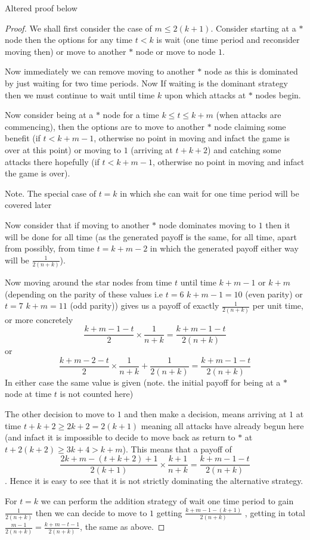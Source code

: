 \documentclass[a4paper,10pt]{article}
\theoremstyle{definition}
\theoremstyle{definition}
\theoremstyle{remark}
\theoremstyle{definition}
\begin{document}
Altered proof below
\begin{proof}
We shall first consider the case of $m \leq 2(k+1)$. Consider starting at a $*$ node then the options for any time $t<k$ is wait (one time period and reconsider moving then) or move to another $*$ node or move to node $1$.

Now immediately we can remove moving to another $*$ node as this is dominated by just waiting for two time periods. Now If waiting is the dominant strategy then we must continue to wait until time $k$ upon which attacks at $*$ nodes begin.

Now consider being at a $*$ node for a time $k \leq t \leq k+m$ (when attacks are commencing), then the options are to move to another $*$ node claiming some benefit (if $t<k+m-1$, otherwise no point in moving and infact the game is over at this point) or moving to $1$ (arriving at $t+k+2$) and catching some attacks there hopefully (if $t < k+m-1$, otherwise no point in moving and infact the game is over).

Note. The special case of $t=k$ in which she can wait for one time period will be covered later

Now consider that if moving to another $*$ node dominates moving to $1$ then it will be done for all time (as the generated payoff is the same, for all time, apart from possibly, from time $t=k+m-2$ in which the generated payoff either way will be $\frac{1}{2(n+k)}$).

Now moving around the star nodes from time $t$ until time $k+m-1$ or $k+m$ (depending on the parity of these values i.e $t=6$ $k+m-1=10$ (even parity) or $t=7$ $k+m=11$ (odd parity)) gives us a payoff of exactly $\frac{1}{2(n+k)}$ per unit time, or more concretely
$$\frac{k+m-1-t}{2} \times \frac{1}{n+k}=\frac{k+m-1-t}{2(n+k)} $$
or
$$\frac{k+m-2-t}{2} \times \frac{1}{n+k}+\frac{1}{2(n+k)}=\frac{k+m-1-t}{2(n+k)}$$
In either case the same value is given (note. the initial payoff for being at a $*$ node at time $t$ is not counted here)

The other decision to move to $1$ and then make a decision, means arriving at $1$ at time $t+k+2 \geq 2k+2=2(k+1)$ meaning all attacks have already begun here (and infact it is impossible to decide to move back as return to $*$ at $t+2(k+2) \geq 3k+4 > k+m$). This means that a payoff of
$$\frac{2k+m-(t+k+2)+1}{2(k+1)} \times \frac{k+1}{n+k}=\frac{k+m-1-t}{2(n+k)}$$.
Hence it is easy to see that it is not strictly dominating the alternative strategy.

For $t=k$ we can perform the addition strategy of wait one time period to gain $\frac{1}{2(n+k)}$ then we can decide to move to $1$ getting $\frac{k+m-1-(k+1)}{2(n+k)}$ , getting in total $\frac{m-1}{2(n+k)}=\frac{k+m-t-1}{2(n+k)}$, the same as above.


\end{proof}
\end{document}
